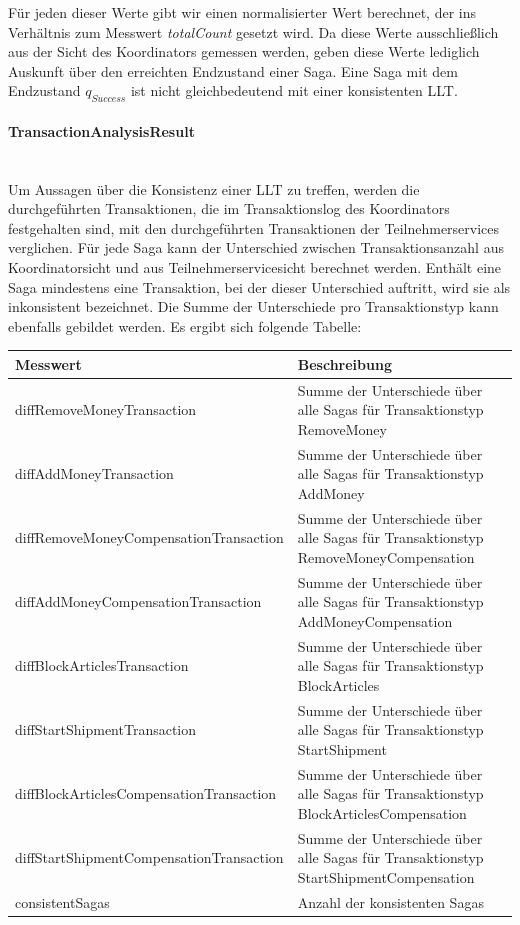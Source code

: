 Für jeden dieser Werte gibt wir einen normalisierter Wert berechnet, der ins Verhältnis zum Messwert \textit{totalCount} gesetzt wird. Da diese Werte ausschließlich aus der Sicht des Koordinators gemessen werden, geben diese Werte lediglich Auskunft über den erreichten Endzustand einer Saga. Eine Saga mit dem Endzustand $q_{Success}$ ist nicht gleichbedeutend mit einer konsistenten LLT. 

\paragraph*{TransactionAnalysisResult} \mbox{}\\
Um Aussagen über die Konsistenz einer LLT zu treffen, werden die durchgeführten Transaktionen, die im Transaktionslog des Koordinators festgehalten sind, mit den durchgeführten Transaktionen der Teilnehmerservices verglichen. Für jede Saga kann der Unterschied zwischen Transaktionsanzahl aus Koordinatorsicht und aus Teilnehmerservicesicht berechnet werden. Enthält eine Saga mindestens eine Transaktion, bei der dieser Unterschied auftritt, wird sie als inkonsistent bezeichnet. Die Summe der Unterschiede pro Transaktionstyp kann ebenfalls gebildet werden. Es ergibt sich folgende Tabelle:

\begin{center}
	\begin{longtable}[h]{|p{5cm}|p{12cm}|}
		\hline
		Messwert & Beschreibung \\ \hline
		diffRemoveMoney\-Transaction & Summe der Unterschiede über alle Sagas für Transaktionstyp RemoveMoney \\ \hline
		diffAddMoney\-Transaction & Summe der Unterschiede über alle Sagas für Transaktionstyp AddMoney \\ \hline
		diffRemoveMoney\-CompensationTransaction &  Summe der Unterschiede über alle Sagas für Transaktionstyp RemoveMoneyCompensation \\ \hline
		diffAddMoney\-CompensationTransaction &  Summe der Unterschiede über alle Sagas für Transaktionstyp AddMoneyCompensation \\ \hline
		diffBlockArticles\-Transaction &  Summe der Unterschiede über alle Sagas für Transaktionstyp BlockArticles \\ \hline
		diffStartShipment\-Transaction &  Summe der Unterschiede über alle Sagas für Transaktionstyp StartShipment \\ \hline
		diffBlockArticles\-CompensationTransaction &  Summe der Unterschiede über alle Sagas für Transaktionstyp BlockArticlesCompensation\\ \hline
		diffStartShipment\-CompensationTransaction &  Summe der Unterschiede über alle Sagas für Transaktionstyp StartShipmentCompensation\\ \hline
		consistentSagas & Anzahl der konsistenten Sagas \\ \hline	
	\end{longtable}
\end{center}
\FloatBarrier

